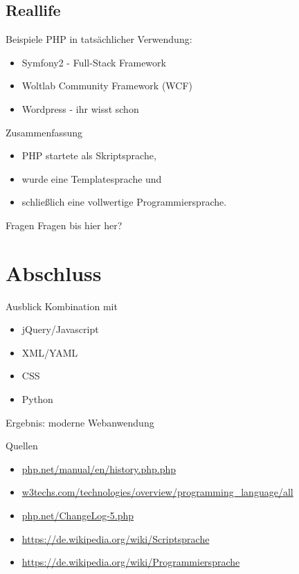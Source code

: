 \documentclass{beamer}
\begin{document}
	\subsection{Reallife}
	\begin{frame}{Beispiele}
		PHP in tatsächlicher Verwendung:
		\begin{itemize}
			\item Symfony2 - Full-Stack Framework
			\item Woltlab Community Framework (WCF)
			\item Wordpress - ihr wisst schon
		\end{itemize}
	\end{frame}
	
	\begin{frame}{Zusammenfassung}
		\begin{itemize}
			\item PHP startete als Skriptsprache,
			\item<2-> wurde eine Templatesprache und
			\item<3-> schließlich eine vollwertige Programmiersprache.
		\end{itemize}
	\end{frame}
	
	\begin{frame}{Fragen}
		Fragen bis hier her?
	\end{frame}
	
	\section{Abschluss}
	\begin{frame}{Ausblick}
		Kombination mit
		\begin{itemize}
			\item jQuery/Javascript
			\item XML/YAML
			\item CSS
			\item Python
		\end{itemize}
		
		Ergebnis: moderne Webanwendung
	\end{frame}
	
	\begin{frame}{Quellen}
		\begin{itemize}
			\item \url{php.net/manual/en/history.php.php}
			\item \url{w3techs.com/technologies/overview/programming_language/all}
			\item \url{php.net/ChangeLog-5.php}
			\item \url{https://de.wikipedia.org/wiki/Scriptsprache}
			\item \url{https://de.wikipedia.org/wiki/Programmiersprache}
		\end{itemize}
	\end{frame}
	
\end{document}
